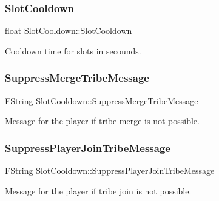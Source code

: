 \subsubsection{\texorpdfstring{Slot\+Cooldown}{SlotCooldown}}
{\footnotesize\ttfamily float Slot\+Cooldown\+::\+Slot\+Cooldown}



Cooldown time for slots in secounds. 

\mbox{\label{namespace_slot_cooldown_abd12b2304b5bf308744798daca9419f6}} 
\subsubsection{\texorpdfstring{Suppress\+Merge\+Tribe\+Message}{SuppressMergeTribeMessage}}
{\footnotesize\ttfamily F\+String Slot\+Cooldown\+::\+Suppress\+Merge\+Tribe\+Message}



Message for the player if tribe merge is not possible. 

\mbox{\label{namespace_slot_cooldown_ad9b4de67b82bb1e9f21fd5d5674b34be}} 
\subsubsection{\texorpdfstring{Suppress\+Player\+Join\+Tribe\+Message}{SuppressPlayerJoinTribeMessage}}
{\footnotesize\ttfamily F\+String Slot\+Cooldown\+::\+Suppress\+Player\+Join\+Tribe\+Message}



Message for the player if tribe join is not possible. 

